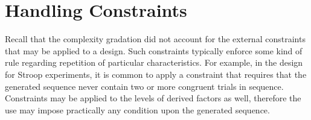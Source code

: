 





\section{Handling Constraints}

Recall that the complexity gradation did not account for the external constraints that may be applied to a design. Such constraints typically enforce some kind of rule regarding repetition of particular characteristics. For example, in the design for Stroop experiments, it is common to apply a constraint that requires that the generated sequence never contain two or more congruent trials in sequence. Constraints may be applied to the levels of derived factors as well, therefore the use may impose practically any condition upon the generated sequence.

